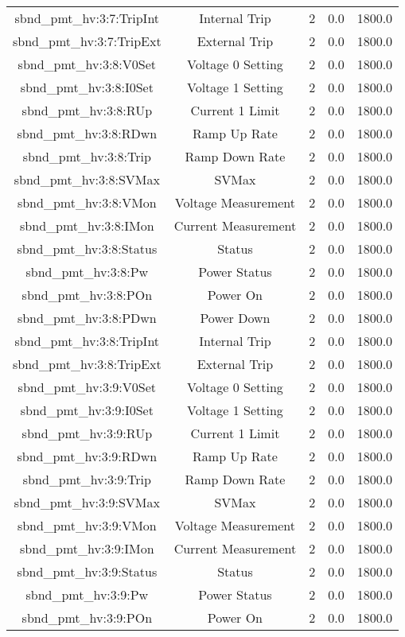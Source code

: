 \begin{table}[ptb]
\begin{tabular}{c | c c c c}
sbnd_pmt_hv:3:7:TripInt & Internal Trip & 2 & 0.0 & 1800.0\\ 
sbnd_pmt_hv:3:7:TripExt & External Trip & 2 & 0.0 & 1800.0\\ 
sbnd_pmt_hv:3:8:V0Set & Voltage 0 Setting & 2 & 0.0 & 1800.0\\ 
sbnd_pmt_hv:3:8:I0Set & Voltage 1 Setting & 2 & 0.0 & 1800.0\\ 
sbnd_pmt_hv:3:8:RUp & Current 1 Limit & 2 & 0.0 & 1800.0\\ 
sbnd_pmt_hv:3:8:RDwn & Ramp Up Rate & 2 & 0.0 & 1800.0\\ 
sbnd_pmt_hv:3:8:Trip & Ramp Down Rate & 2 & 0.0 & 1800.0\\ 
sbnd_pmt_hv:3:8:SVMax & SVMax & 2 & 0.0 & 1800.0\\ 
sbnd_pmt_hv:3:8:VMon & Voltage Measurement & 2 & 0.0 & 1800.0\\ 
sbnd_pmt_hv:3:8:IMon & Current Measurement & 2 & 0.0 & 1800.0\\ 
sbnd_pmt_hv:3:8:Status & Status & 2 & 0.0 & 1800.0\\ 
sbnd_pmt_hv:3:8:Pw & Power Status & 2 & 0.0 & 1800.0\\ 
sbnd_pmt_hv:3:8:POn & Power On & 2 & 0.0 & 1800.0\\ 
sbnd_pmt_hv:3:8:PDwn & Power Down & 2 & 0.0 & 1800.0\\ 
sbnd_pmt_hv:3:8:TripInt & Internal Trip & 2 & 0.0 & 1800.0\\ 
sbnd_pmt_hv:3:8:TripExt & External Trip & 2 & 0.0 & 1800.0\\ 
sbnd_pmt_hv:3:9:V0Set & Voltage 0 Setting & 2 & 0.0 & 1800.0\\ 
sbnd_pmt_hv:3:9:I0Set & Voltage 1 Setting & 2 & 0.0 & 1800.0\\ 
sbnd_pmt_hv:3:9:RUp & Current 1 Limit & 2 & 0.0 & 1800.0\\ 
sbnd_pmt_hv:3:9:RDwn & Ramp Up Rate & 2 & 0.0 & 1800.0\\ 
sbnd_pmt_hv:3:9:Trip & Ramp Down Rate & 2 & 0.0 & 1800.0\\ 
sbnd_pmt_hv:3:9:SVMax & SVMax & 2 & 0.0 & 1800.0\\ 
sbnd_pmt_hv:3:9:VMon & Voltage Measurement & 2 & 0.0 & 1800.0\\ 
sbnd_pmt_hv:3:9:IMon & Current Measurement & 2 & 0.0 & 1800.0\\ 
sbnd_pmt_hv:3:9:Status & Status & 2 & 0.0 & 1800.0\\ 
sbnd_pmt_hv:3:9:Pw & Power Status & 2 & 0.0 & 1800.0\\ 
sbnd_pmt_hv:3:9:POn & Power On & 2 & 0.0 & 1800.0\\ 

\end{tabular}
\end{table}
